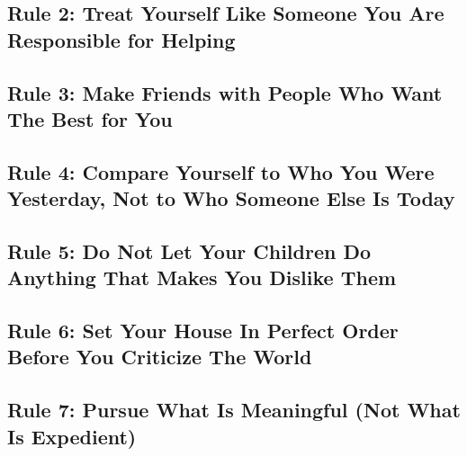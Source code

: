 \documentclass{article}
\begin{document}

\subsection{Rule 2: Treat Yourself Like Someone You Are Responsible for Helping}


\subsection{Rule 3: Make Friends with People Who Want The Best for You}


\subsection{Rule 4: Compare Yourself to Who You Were Yesterday, Not to Who Someone Else Is Today}


\subsection{Rule 5: Do Not Let Your Children Do Anything That Makes You Dislike Them}


\subsection{Rule 6: Set Your House In Perfect Order Before You Criticize The World}


\subsection{Rule 7: Pursue What Is Meaningful (Not What Is Expedient)}
\end{document}
